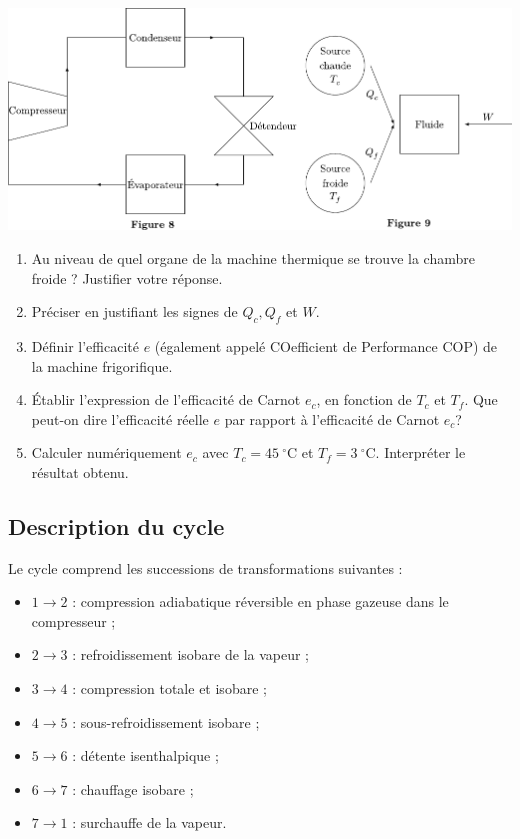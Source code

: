 \documentclass[a4paper, 12pt, garamond]{book}
\begin{document}
\begin{center}

	\includegraphics[scale=1]{figures/pb-chambre-fig89.pdf}

\end{center}

\begin{enumerate}
	\item
	      Au niveau de quel organe de la machine thermique se trouve la chambre
	      froide ? Justifier votre réponse.
	\item
	      Préciser en justifiant les signes de \(Q_c,Q_f\) et \(W\).
	\item
	      Définir l'efficacité \(e\) (également appelé COefficient de
	      Performance COP) de la machine frigorifique.
	\item
	      Établir l'expression de l'efficacité de Carnot \(e_c\), en fonction de
	      \(T_c\) et \(T_f\). Que peut-on dire l'efficacité réelle \(e\) par
	      rapport à l'efficacité de Carnot \(e_c\)?
	\item
	      Calculer numériquement \(e_c\) avec \(T_c = 45\ ^\circ\mathrm{C}\) et
	      \(T_f = 3\ ^\circ\mathrm{C}\). Interpréter le résultat obtenu.
\end{enumerate}

\subsection{Description du cycle}

Le cycle comprend les successions de transformations suivantes :

\begin{itemize}
	\item
	      \(1 \to 2\) : compression adiabatique réversible en phase gazeuse dans
	      le compresseur ;
	\item
	      \(2 \to 3\) : refroidissement isobare de la vapeur ;
	\item
	      \(3 \to 4\) : compression totale et isobare ;
	\item
	      \(4 \to 5\) : sous-refroidissement isobare ;
	\item
	      \(5 \to 6\) : détente isenthalpique ;
	\item
	      \(6 \to 7\) : chauffage isobare ;
	\item
	      \(7 \to 1\) : surchauffe de la vapeur.
\end{itemize}
\end{document}
